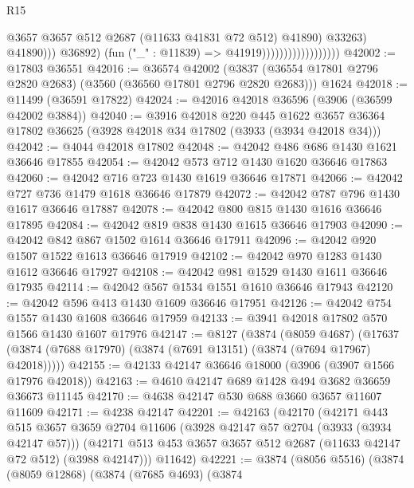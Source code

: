 \begin{lexlean}{R15}
\begin{coremodule}
                                                  @3657
                                                  @3657
                                                  @512
                                                  @2687
                                                  (@11633 @41831 @72 @512)
                                                  @41890)
                                                @33263)
                                              @41890)))
                                        @36892)
                                      (fun ("_" : @11839) => @41919))))))))))))))))))
@42002 := @17803 @36551
@42016 := @36574
    @42002
    (@3837 (@36554 @17801 @2796 @2820 @2683) (@3560 (@36560 @17801 @2796 @2820 @2683)))
    @1624
@42018 := @11499 (@36591 @17822)
@42024 := @42016 @42018 @36596 (@3906 (@36599 @42002 @3884))
@42040 := @3916
    @42018
    @220
    @445
    @1622
    @3657
    @36364
    @17802
    @36625
    (@3928 @42018 @34 @17802 (@3933 (@3934 @42018 @34)))
@42042 := @4044 @42018 @17802
@42048 := @42042 @486 @686 @1430 @1621 @36646 @17855
@42054 := @42042 @573 @712 @1430 @1620 @36646 @17863
@42060 := @42042 @716 @723 @1430 @1619 @36646 @17871
@42066 := @42042 @727 @736 @1479 @1618 @36646 @17879
@42072 := @42042 @787 @796 @1430 @1617 @36646 @17887
@42078 := @42042 @800 @815 @1430 @1616 @36646 @17895
@42084 := @42042 @819 @838 @1430 @1615 @36646 @17903
@42090 := @42042 @842 @867 @1502 @1614 @36646 @17911
@42096 := @42042 @920 @1507 @1522 @1613 @36646 @17919
@42102 := @42042 @970 @1283 @1430 @1612 @36646 @17927
@42108 := @42042 @981 @1529 @1430 @1611 @36646 @17935
@42114 := @42042 @567 @1534 @1551 @1610 @36646 @17943
@42120 := @42042 @596 @413 @1430 @1609 @36646 @17951
@42126 := @42042 @754 @1557 @1430 @1608 @36646 @17959
@42133 := @3941 @42018 @17802 @570 @1566 @1430 @1607 @17976
@42147 := @8127
    (@3874
      (@8059 @4687)
      (@17637 (@3874 (@7688 @17970) (@3874 (@7691 @13151) (@3874 (@7694 @17967) @42018)))))
@42155 := @42133 @42147 @36646 @18000 (@3906 (@3907 @1566 @17976 @42018))
@42163 := @4610 @42147 @689 @1428 @494 @3682 @36659 @36673 @11145
@42170 := @4638 @42147 @530 @688 @3660 @3657 @11607 @11609
@42171 := @4238 @42147
@42201 := @42163
    (@42170
      (@42171
        @443
        @515
        @3657
        @3659
        @2704
        @11606
        (@3928 @42147 @57 @2704 (@3933 (@3934 @42147 @57)))
        (@42171 @513 @453 @3657 @3657 @512 @2687 (@11633 @42147 @72 @512) (@3988 @42147)))
      @11642)
@42221 := @3874
    (@8056 @5516)
    (@3874
      (@8059 @12868)
      (@3874
        (@7685 @4693)
        (@3874

\end{coremodule}
\end{lexlean}
